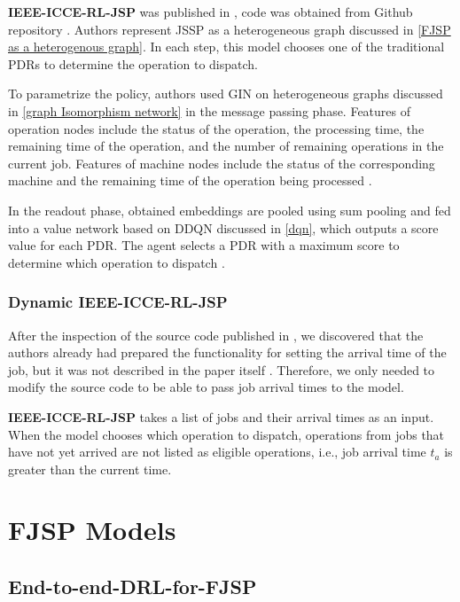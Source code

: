 \textbf{IEEE-ICCE-RL-JSP} was published in \cite{10226873}, code was obtained from Github repository \cite{github_ieee_icce_rl_jsp}. Authors represent JSSP as a heterogeneous graph discussed in \ref{FJSP as a heterogenous graph}. In each step, this model chooses one of the traditional PDRs to determine the operation to dispatch.
\par
To parametrize the policy, authors used GIN on heterogeneous graphs discussed in \ref{graph Isomorphism network} in the message passing phase. Features of operation nodes include the status of the operation, the processing time, the remaining time of the operation, and the number of remaining operations in the current job. Features of machine nodes include the status of the corresponding machine and the remaining time of the operation being processed \cite{10226873}.
\par
In the readout phase, obtained embeddings are pooled using sum pooling and fed into a value network based on DDQN discussed in \ref{dqn}, which outputs a score value for each PDR. The agent selects a PDR with a maximum score to determine which operation to dispatch \cite{10226873}.

\subsubsection{Dynamic IEEE-ICCE-RL-JSP}

After the inspection of the source code \cite{github_ieee_icce_rl_jsp} published in \cite{10226873}, we discovered that the authors already had prepared the functionality for setting the arrival time of the job, but it was not described in the paper itself \cite{10226873}. Therefore, we only needed to modify the source code to be able to pass job arrival times to the model. 
\par
\textbf{IEEE-ICCE-RL-JSP} takes a list of jobs and their arrival times as an input. When the model chooses which operation to dispatch, operations from jobs that have not yet arrived are not listed as eligible operations, i.e., job arrival time $t_a$ is greater than the current time.

\section{FJSP Models}

\subsection{End-to-end-DRL-for-FJSP} 

